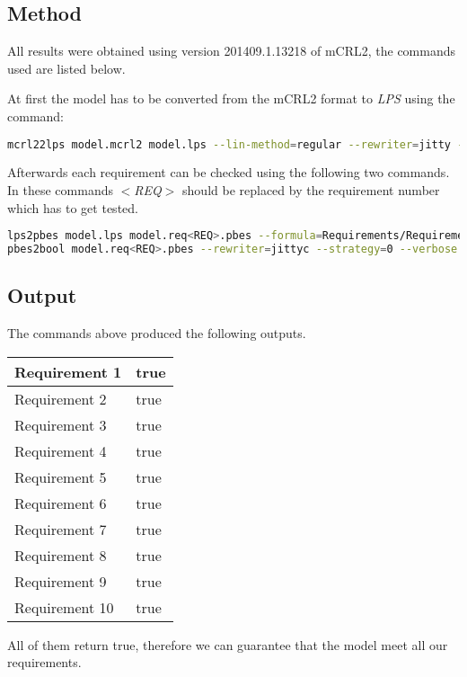 \cbstart


\subsection{Method}
All results were obtained using version 201409.1.13218 of mCRL2, the commands used are listed below.

At first the model has to be converted from the mCRL2 format to \emph{LPS} using the command:
\begin{lstlisting}[language=bash]
mcrl22lps model.mcrl2 model.lps --lin-method=regular --rewriter=jitty --verbose
\end{lstlisting}

Afterwards each requirement can be checked using the following two commands. In these commands \emph{$<$REQ$>$} should be replaced by the requirement number which has to get tested.

\begin{lstlisting}[language=bash]
lps2pbes model.lps model.req<REQ>.pbes --formula=Requirements/Requirement<REQ>.mcf --verbose
pbes2bool model.req<REQ>.pbes --rewriter=jittyc --strategy=0 --verbose
\end{lstlisting}

\subsection{Output}

The commands above produced the following outputs.


\begin{tabular}{|l|l|}
\hline
Requirement 1 & true \\
\hline
Requirement 2 & true \\
\hline
Requirement 3 & true \\
\hline
Requirement 4 & true \\
\hline
Requirement 5 & true \\
\hline
Requirement 6 & true \\
\hline
Requirement 7 & true \\
\hline
Requirement 8 & true \\
\hline
Requirement 9 & true \\
\hline
Requirement 10 & true \\
\hline
\end{tabular}


All of them return true, therefore we can guarantee that the model meet all our requirements.

\cbend